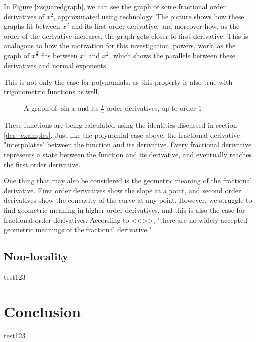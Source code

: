 \documentclass{article}
\begin{document}
In Figure \ref{xsquaredgraph}, we can see the graph of some fractional order
derivatives of $x^2$, approximated using technology. The picture shows how
these graphs fit between $x^2$ and its first order derivative, and moreover
how, as the order of the derivative increases, the graph gets closer to first
derivative. This is analogous to how the motivation for this investigation,
powers, work, as the graph of $x^\frac{3}{2}$ fits between $x^1$ and $x^2$,
which shows the parallels between these derivatives and normal exponents.

This is not only the case for polynomials, as this property is also true with
trigonometric functions as well.

\begin{figure}[H]
\def\figtwoxmax{2*pi}
\centering
{}
\caption{A graph of $\sin{x}$ and its $\frac{1}{4}$ order derivatives, up to order $1$} \label{singraph}
\end{figure}

These functions are being calculated using the identities discussed in section
\ref{der_examples}. Just like the polynomial case above, the fractional
derivative "interpolates" between the function and its derivative. Every
fractional derivative represents a state between the function and its
derivative, and eventually reaches the first order derivative.

One thing that may also be considered is the geometric meaning of the
fractional derivative. First order derivatives show the slope at a point, and
second order derivatives show the concavity of the curve at any point. However,
we struggle to find geometric meaning in higher order derivatives, and this is
also the  case for fractional order derivatives. According to <<>>, "there are
no widely accepted geometric meanings of the fractional derivative."

\subsection{Non-locality} \label{nonlocality}
test123

\section{Conclusion}
test123
\end{document}
